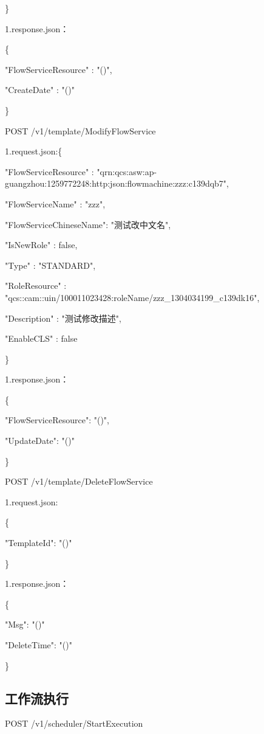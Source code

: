 \}

1.response.json：

\{

"FlowServiceResource"   : "\@exists()",

"CreateDate"            : "\@exists()"

\}



POST /v1/template/ModifyFlowService

1.request.json:\{

    "FlowServiceResource"   : "qrn:qcs:asw:ap-guangzhou:1259772248:http:json:flowmachine:zzz:c139dqb7",


    "FlowServiceName"       :  "zzz",

    "FlowServiceChineseName":  "测试改中文名",

    "IsNewRole"             :  false,

    "Type"                  :  "STANDARD",

    "RoleResource"          :  "qcs::cam::uin/100011023428:roleName/zzz\_1304034199\_c139dk16",

    "Description"           :  "测试修改描述",

    "EnableCLS"             :  false

\}

1.response.json：

\{

"FlowServiceResource": "\@notEmpty()",

"UpdateDate": "\@notEmpty()"

\}

POST /v1/template/DeleteFlowService

1.request.json:

\{

    "TemplateId": "\@exists()"

\}


1.response.json：

\{

    "Msg": "\@exists()"

    "DeleteTime": "\@exists()"

\}


\subsection{工作流执行}
POST /v1/scheduler/StartExecution

